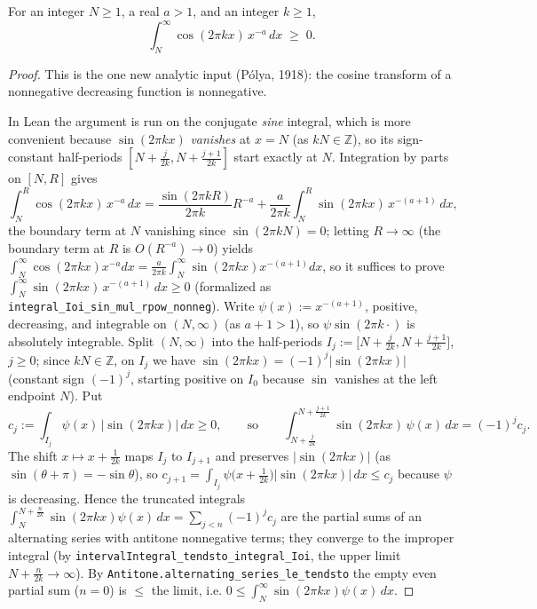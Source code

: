 \begin{lemma}
\label{lem:polya_cos}
\leanok
For an integer $N \ge 1$, a real $a > 1$, and an integer $k \ge 1$,
\[
  \int_N^{\infty}\cos(2\pi k x)\,x^{-a}\,dx \;\ge\; 0 .
\]
\end{lemma}

\begin{proof}
\leanok
This is the one new analytic input (Pólya, 1918): the cosine transform of a
nonnegative decreasing function is nonnegative.

In Lean the argument is run on the conjugate \emph{sine} integral, which is more convenient
because $\sin(2\pi k x)$ \emph{vanishes} at $x=N$ (as $kN \in \mathbb{Z}$), so its sign-constant
half-periods $[N+\tfrac{j}{2k}, N+\tfrac{j+1}{2k}]$ start exactly at $N$. Integration by parts on
$[N,R]$ gives
\[
  \int_N^{R}\cos(2\pi k x)\,x^{-a}\,dx
  = \frac{\sin(2\pi k R)}{2\pi k}R^{-a}
    + \frac{a}{2\pi k}\int_N^{R}\sin(2\pi k x)\,x^{-(a+1)}\,dx,
\]
the boundary term at $N$ vanishing since $\sin(2\pi k N)=0$; letting $R\to\infty$ (the boundary
term at $R$ is $O(R^{-a})\to 0$) yields
$\int_N^{\infty}\cos(2\pi k x)x^{-a}dx = \frac{a}{2\pi k}\int_N^{\infty}\sin(2\pi k x)x^{-(a+1)}dx$,
so it suffices to prove $\int_N^{\infty}\sin(2\pi k x)\,x^{-(a+1)}\,dx \ge 0$ (formalized as
\texttt{integral\_Ioi\_sin\_mul\_rpow\_nonneg}). Write $\psi(x) := x^{-(a+1)}$, positive,
decreasing, and integrable on $(N,\infty)$ (as $a+1 > 1$), so $\psi\sin(2\pi k\cdot)$ is absolutely
integrable. Split $(N,\infty)$ into the half-periods
$I_j := \bigl[N + \tfrac{j}{2k}, N + \tfrac{j+1}{2k}\bigr]$, $j \ge 0$; since $kN \in \mathbb{Z}$,
on $I_j$ we have $\sin(2\pi k x) = (-1)^j\bigl|\sin(2\pi k x)\bigr|$ (constant sign $(-1)^j$,
starting positive on $I_0$ because $\sin$ vanishes at the left endpoint $N$). Put
\[
  c_j := \int_{I_j}\psi(x)\,|\sin(2\pi k x)|\,dx \ge 0,
  \qquad\text{so}\qquad
  \int_{N+\frac{j}{2k}}^{N+\frac{j+1}{2k}}\sin(2\pi k x)\,\psi(x)\,dx = (-1)^j c_j .
\]
The shift $x \mapsto x + \tfrac{1}{2k}$ maps $I_j$ to $I_{j+1}$ and preserves $|\sin(2\pi k x)|$
(as $\sin(\theta+\pi) = -\sin\theta$), so
$c_{j+1} = \int_{I_j}\psi\bigl(x+\tfrac1{2k}\bigr)|\sin(2\pi k x)|\,dx \le c_j$ because $\psi$ is
decreasing. Hence the truncated integrals $\int_N^{N+\frac{n}{2k}}\sin(2\pi k x)\psi(x)\,dx
= \sum_{j<n}(-1)^j c_j$ are the partial sums of an alternating series with antitone nonnegative
terms; they converge to the improper integral (by
\texttt{intervalIntegral\_tendsto\_integral\_Ioi}, the upper limit $N+\tfrac{n}{2k}\to\infty$).
By \texttt{Antitone.alternating\_series\_le\_tendsto} the empty even partial sum ($n=0$) is
$\le$ the limit, i.e. $0 \le \int_N^{\infty}\sin(2\pi k x)\psi(x)\,dx$.
\end{proof}

